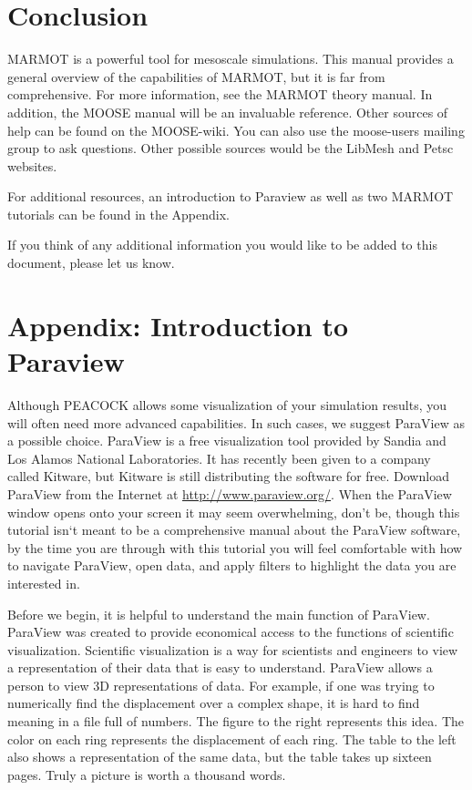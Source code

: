 \documentclass[letter,12pt,fleqn]{article}
\begin{document}
\section{Conclusion}
MARMOT is a powerful tool for mesoscale simulations. This manual provides a general overview of the capabilities of MARMOT, but it is far from comprehensive. For more information, see the MARMOT theory manual. In addition, the MOOSE manual will be an invaluable reference. Other sources of help can be found on the MOOSE-wiki. You can also use the moose-users mailing group to ask questions. Other possible sources would be the LibMesh and Petsc websites. 

For additional resources, an introduction to Paraview as well as two MARMOT tutorials can be found in the Appendix.

If you think of any additional information you would like to be added to this document, please let us know.


 


\appendix
\section{Appendix: Introduction to Paraview}

Although PEACOCK allows some visualization of your simulation results, you will often need more advanced capabilities. In such cases, we suggest ParaView as a possible choice. ParaView is a free visualization tool provided by Sandia and Los Alamos National Laboratories. It has recently been given to a company called Kitware, but Kitware is still distributing the software for free. Download ParaView from the Internet at \url{http://www.paraview.org/}. When the ParaView window opens onto your screen it may seem overwhelming, don't be, though this tutorial isn`t meant to be a comprehensive manual about the ParaView software, by the time you are through with this tutorial you will feel comfortable with how to navigate ParaView, open data, and apply filters to highlight the data you are interested in.

Before we begin, it is helpful to understand the main function of ParaView. ParaView was created to provide economical access to the functions of scientific visualization. Scientific visualization is a way for scientists and engineers to view a representation of their data that is easy to understand. ParaView allows a person to view 3D representations of data. For example, if one was trying to numerically find the displacement over a complex shape, it is hard to find meaning in a file full of numbers. The figure to the right represents this idea. The color on each ring represents the displacement of each ring. The table to the left also shows a representation of the same data, but the table takes up sixteen pages. Truly a picture is worth a thousand words.
  
\end{document}
